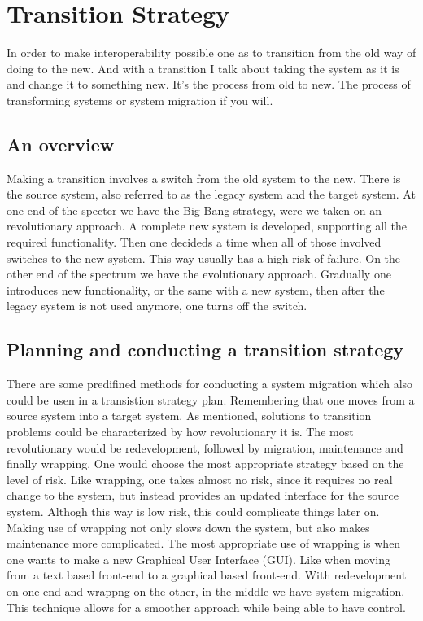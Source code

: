 \chapter{Transition Strategy}
In order to make interoperability possible one as to transition from the old way of doing to the new.
And with a transition I talk about taking the system as it is and change it to something new. It's the process from old to new.
The process of transforming systems or system migration if you will.
\section{An overview}
Making a transition involves a switch from the old system to the new.
There is the source system, also referred to as the legacy system and the target system.
At one end of the specter we have the Big Bang strategy, were we taken on an revolutionary approach.
A complete new system is developed, supporting all the required functionality. 
Then one decideds a time when all of those involved switches to the new system. 
This way usually has a high risk of failure.
On the other end of the spectrum we have the evolutionary approach. Gradually one introduces new functionality, or the same with a new system, then after the legacy system is not used anymore, one turns off the switch.
\section{Planning and conducting a transition strategy}
There are some predifined methods for conducting a system migration which also could be usen in a transistion strategy plan.
Remembering that one moves from a source system into a target system.
As mentioned, solutions to transition problems could be characterized by how revolutionary it is.
The most revolutionary would be redevelopment, followed by migration, maintenance and finally wrapping.
One would choose the most appropriate strategy based on the level of risk. 
Like wrapping, one takes almost no risk, since it requires no real change to the system, but instead provides an updated interface for the source system.
Althogh this way is low risk, this could complicate things later on. Making use of wrapping not only slows down the system, but also makes maintenance more complicated.
The most appropriate use of wrapping is when one wants to make a new Graphical User Interface (GUI).
Like when moving from a text based front-end to a graphical based front-end.
With redevelopment on one end and wrappng on the other, in the middle we have system migration. 
This technique allows for a smoother approach while being able to have control.
